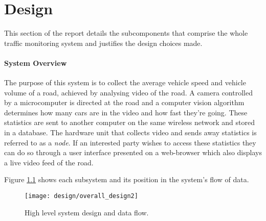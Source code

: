 \chapter{Design}

This section of the report details the subcomponents that comprise the whole traffic monitoring system and justifies the design choices made.

\subsubsection{System Overview}

The purpose of this system is to collect the average vehicle speed and vehicle volume of a road, achieved by analysing video of the road. A camera controlled by a microcomputer is directed at the road and a computer vision algorithm determines how many cars are in the video and how fast they're going. These statistics are sent to another computer on the same wireless network and stored in a database. The hardware unit that collects video and sends away statistics is referred to as a \emph{node}. If an interested party wishes to access these statistics they can do so through a user interface presented on a web-browser which also displays a live video feed of the road.

Figure \ref{fig:overall_design} shows each subsystem and its position in the system's flow of data.

\begin{figure}[H]
    \centering
    \texttt{[image: design/overall\_design2]}
    \caption{High level system design and data flow.}
    \label{fig:overall_design}
\end{figure}








